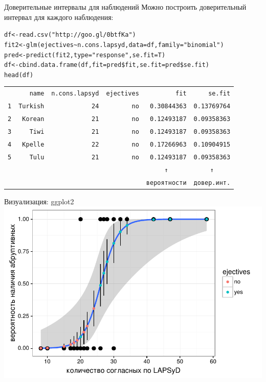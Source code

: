 \begin{frame}{Доверительные интервалы для наблюдений}
Можно построить доверительный интервал для каждого наблюдения:
\scriptsize
\begin{alltt}
df <- read.csv("http://goo.gl/0btfKa")\\
fit2 <- \alert{glm(ejectives \textasciitilde n.cons.lapsyd}, data = df, \alert{family = "binomial")}\medskip\\
pred <- predict(fit2, type="response"{}, se.fit = T)\\
df <- cbind.data.frame(df, fit = pred\$fit, se.fit = pred\$se.fit)\\
head(df)\\
\begin{tabular}{rrrrrr}
&        name & n.cons.lapsyd & ejectives  &      \alert{fit}  &   \alert{se.fit}\\
1  &  Turkish        &    24    &    no   &  \alert{0.30844363} & \alert{0.13769764}\\
2 &    Korean      &      21     &   no & \alert{0.12493187} & \alert{0.09358363}\\
3    &   Tiwi        &    21      &  no & \alert{0.12493187} & \alert{0.09358363}\\
4   &  Kpelle    &        22     &   no & \alert{0.17266963} & \alert{0.10904915}\\
5      & Tulu         &   21   &     no & \alert{0.12493187} & \alert{0.09358363}\\
&&&& \multicolumn{1}{c}{\alert{↑}} & \multicolumn{1}{c}{\alert{↑}} \\
&&&& \alert{вероятности} & \alert{довер. инт.} \\
\end{tabular}
\end{alltt}
\end{frame}
\begin{frame}{Визуализация: ggplot2}
\includegraphics[width=\linewidth]{logitse.pdf}
\end{frame}
